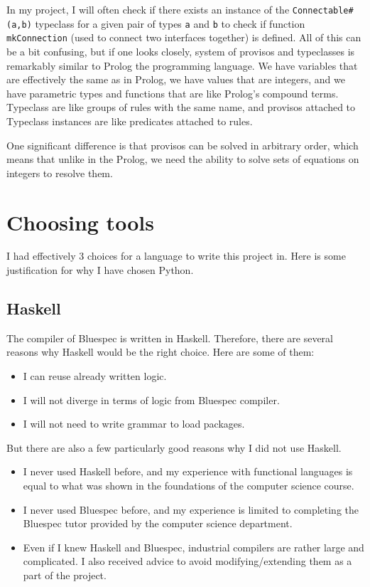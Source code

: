 \documentclass[12pt]{report}
\begin{document}
In my project, I will often check if there exists an instance of the \verb!Connectable#(a,b)! typeclass for a given pair of types \verb!a! and \verb!b! to check if function \verb!mkConnection! (used to connect two interfaces together) is defined.  
All of this can be a bit confusing, but if one looks closely, system of provisos and typeclasses is remarkably similar to Prolog the programming language. We have variables that are effectively the same as in Prolog, we have values that are integers, and we have parametric types and functions that are like Prolog's compound terms. Typeclass are like groups of rules with the same name, and provisos attached to Typeclass instances are like predicates attached to rules.  

One significant difference is that provisos can be solved in arbitrary order, which means that unlike in the Prolog, we need the ability to solve sets of equations on integers to resolve them.

\section{Choosing tools}
I had effectively 3 choices for a language to write this project in. Here is some justification for why I have chosen Python.   

\subsection{Haskell}  

The compiler of Bluespec is written in Haskell. Therefore, there are several reasons why Haskell would be the right choice. Here are some of them:  
\begin{itemize}  
   \item I can reuse already written logic.  
   \item I will not diverge in terms of logic from Bluespec compiler.  
   \item I will not need to write grammar to load packages.  
\end{itemize}  
But there are also a few particularly good reasons why I did not use Haskell.  
\begin{itemize}  

   \item I never used Haskell before, and my experience with functional languages is equal to what was shown in the foundations of the computer science course.  

   \item I never used Bluespec before, and my experience is limited to completing the Bluespec tutor provided by the computer science department.  

   \item Even if I knew Haskell and Bluespec, industrial compilers are rather large and complicated. I also received advice to avoid modifying/extending them as a part of the project.  

\end{itemize}  
\end{document}
